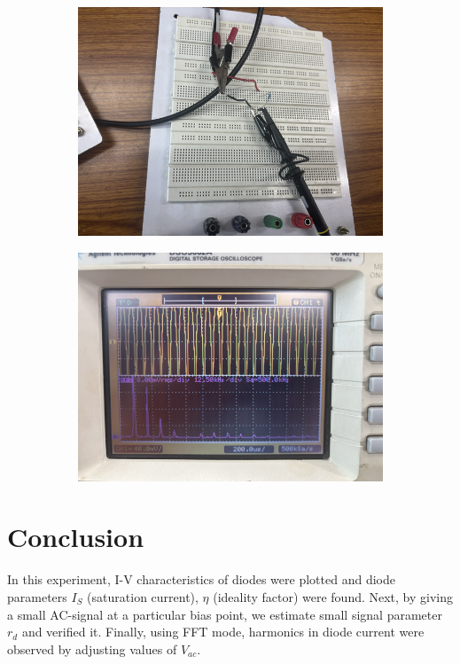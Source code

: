 \documentclass[12pt,a4paper]{article}
\begin{document}
\begin{figure}[h!]
\centering
\begin{subfigure}[b]{0.47\linewidth}
    \centering
    \includegraphics[width=\textwidth]{Experiment_5/figs/FFT_ckt.png}
\end{subfigure}
\begin{subfigure}[b]{0.48\linewidth}
    \centering
    \includegraphics[width=\textwidth]{Experiment_5/figs/FFT_osc.png}
\end{subfigure}
\end{figure}

\section{Conclusion}
In this experiment, I-V characteristics of diodes were plotted and diode parameters $I_S$ (saturation current), $\eta$ (ideality factor) were found. Next, by giving a small AC-signal at a particular bias point, we estimate small signal parameter $r_d$ and verified it. Finally, using FFT mode, harmonics in diode current were observed by adjusting values of $V_{ac}$.
\end{document}
